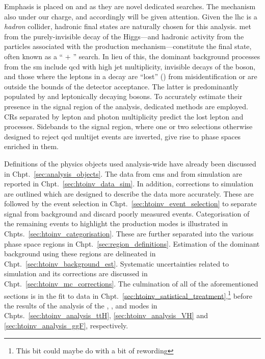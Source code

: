 Emphasis is placed on \ttH and \VH as they are novel dedicated searches. The \ggH mechanism also under our charge, and accordingly will be given attention. Given the \acrshort{lhc} is a \emph{hadron} collider, hadronic final states are naturally chosen for this analysis. \Gls{met} from the purely-invisible decay of the Higgs---and hadronic activity from the particles associated with the production mechanism---constitute the final state, often known as a `` $+$ \ptmiss'' search. In lieu of this, the dominant background processes from the \acrlong{sm} include \acrshort{qcd} with high \gls{jet} multiplicity, invisible decays of the \PZ boson, and those where the leptons in a decay are ``lost'' (\lostlepton) from misidentification or are outside the bounds of the detector acceptance. The latter is predominantly populated by \ttbar and leptonically decaying \PW bosons. To accurately estimate their presence in the signal region of the analysis, dedicated methods are employed. \Glspl{CR} separated by lepton and photon multiplicity predict the lost lepton and \ztonunu processes. Sidebands to the signal region, where one or two selections otherwise designed to reject \acrshort{qcd} multijet events are inverted, give rise to phase spaces enriched in them.

Definitions of the physics objects used analysis-wide have already been discussed in Chpt.~\ref{sec:analysis_objects}. The data from \acrshort{cms} and from simulation are reported in Chpt.~\ref{sec:htoinv_data_sim}. In addition, corrections to simulation are outlined which are designed to describe the data more accurately. These are followed by the event selection in Chpt.~\ref{sec:htoinv_event_selection} to separate signal from background and discard poorly measured events. Categorisation of the remaining events to highlight the production modes is illustrated in Chpts.~\ref{sec:htoinv_categorisation}. These are further separated into the various phase space regions in Chpt.~\ref{sec:region_definitions}. Estimation of the dominant background using these regions are delineated in Chpt.~\ref{sec:htoinv_background_est}. Systematic uncertainties related to simulation and its corrections are discussed in Chpt.~\ref{sec:htoinv_mc_corrections}. The culmination of all of the aforementioned sections is in the fit to data in Chpt.~\ref{sec:htoinv_satistical_treatment},\footnote{This bit could maybe do with a bit of rewording} before the results of the analysis of the \ttH, \VH, and \ggH modes in Chpts.~\ref{sec:htoinv_analysis_ttH}, \ref{sec:htoinv_analysis_VH} and \ref{sec:htoinv_analysis_ggF}, respectively.

